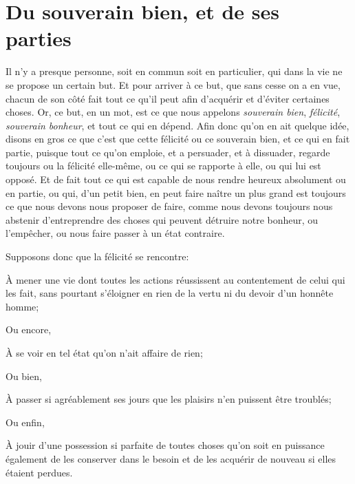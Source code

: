 
\section{Du souverain bien, et de ses parties}

Il n'y a presque personne, soit en commun soit en particulier, qui dans la vie ne se propose un certain
but. Et pour arriver à ce but, que sans cesse on a en vue, chacun de son côté fait tout ce qu'il peut afin
d'acquérir et d'éviter certaines choses. Or, ce but, en un mot, est ce que nous appelons \emph{souverain
bien}, \emph{félicité}, \emph{souverain bonheur}, et tout ce qui en dépend. Afin donc qu'on en ait quelque
idée, disons en gros ce que c'est que cette félicité ou ce souverain bien, et ce qui en fait partie, puisque
tout ce qu'on emploie, et a persuader, et à dissuader, regarde toujours ou la félicité elle-même, ou ce qui
se rapporte à elle, ou qui lui est opposé. Et de fait tout ce qui est capable de nous rendre heureux absolument
ou en partie, ou qui, d'un petit bien, en peut faire naître un plus grand est toujours ce que nous devons nous
proposer de faire, comme nous devons toujours nous abstenir d'entreprendre des choses qui peuvent détruire
notre bonheur, ou l'empêcher, ou nous faire passer à un état contraire. 

Supposons donc que la félicité se rencontre:

\begin{emphpar}
	À mener une vie dont toutes les actions réussissent au contentement de celui qui les fait, sans pourtant
	s'éloigner en rien de la vertu ni du devoir d'un honnête homme;
\end{emphpar}

Ou encore, 

\begin{emphpar}
	À se voir en tel état qu'on n'ait affaire de rien;
\end{emphpar}

Ou bien,

\begin{emphpar}
	À passer si agréablement ses jours que les plaisirs n'en puissent être troublés;
\end{emphpar}

Ou enfin,

\begin{emphpar}
	À jouir d'une possession si parfaite de toutes choses qu'on soit en puissance également de les conserver
	dans le besoin et de les acquérir de nouveau si elles étaient perdues.
\end{emphpar}

